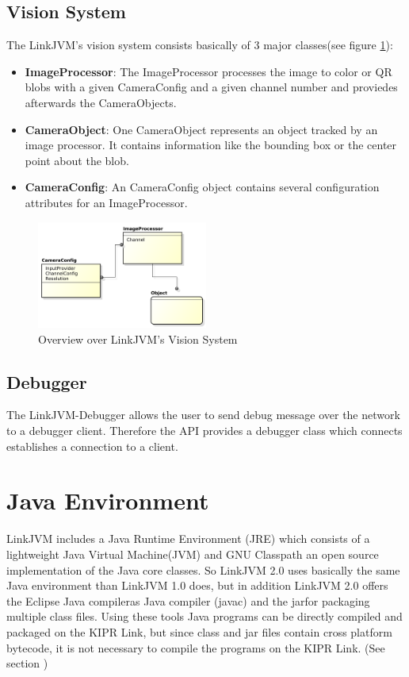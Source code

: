 \documentclass{juniorjournal}
\begin{document}
\subsection{Vision System}
The LinkJVM's vision system consists basically of 3 major classes(see figure \ref{fig:Vision-System}):
\begin{itemize}
	\item {\bf ImageProcessor}: The ImageProcessor processes the image to color or QR blobs with a given CameraConfig and a given channel number and proviedes afterwards the CameraObjects.
	\item {\bf CameraObject}: One CameraObject represents an object tracked by an image processor. It contains information like the bounding box or the center point about the blob.
	\item {\bf CameraConfig}: An CameraConfig object contains several configuration attributes for an ImageProcessor.
\end{itemize}
\begin{figure}[H]
\centering
\includegraphics[width=0.5\textwidth]{images/vision.pdf}
\caption{Overview over LinkJVM's Vision System}
\label{fig:Vision-System}
\end{figure}


\subsection{Debugger}
The LinkJVM-Debugger allows the user to send debug message over the network to a debugger client.
Therefore the API provides a debugger class which connects establishes a connection to a client.


\section{Java Environment}
LinkJVM includes a Java Runtime Environment\cite{JRE} (JRE) which consists of a lightweight Java Virtual Machine(JVM) and GNU Classpath an open source implementation of the Java core classes.
So LinkJVM 2.0 uses basically the same Java environment than LinkJVM 1.0 does, but in addition LinkJVM 2.0 offers the \frqq Eclipse Java compiler\flqq  as Java compiler (javac) and the \frqq jar\flqq  for packaging multiple class files.
Using these tools Java programs can be directly compiled and packaged on the KIPR Link, but since class and jar files contain cross platform bytecode, it is not necessary to compile the programs on the KIPR Link. (See section )
\end{document}
